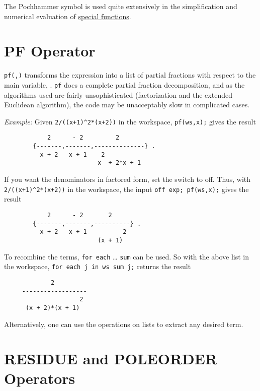 The Pochhammer symbol is used quite extensively in the simplification and
numerical evaluation of \hyperlink{SPECFNS}{special functions}.

\section{PF Operator}
\hypertarget{operator:PF}{}

\texttt{pf(,)} transforms the expression  into
a list of partial fractions with respect to the main variable, .
\texttt{pf}
does a complete partial fraction decomposition, and as the algorithms used
are fairly unsophisticated (factorization and the extended Euclidean
algorithm), the code may be unacceptably slow in complicated cases.

\textit{Example:}
Given \texttt{2/((x+1)\textasciicircum2*(x+2))} in the workspace,
\texttt{pf(ws,x);} gives the result
\begin{samepage}
\begin{verbatim}
            2      - 2         2
        {-------,-------,--------------} .
          x + 2   x + 1    2
                          x  + 2*x + 1
\end{verbatim}
\end{samepage}

If you want the denominators in factored form, set the switch  to off.
Thus, with \texttt{2/((x+1)\textasciicircum2*(x+2))} in the workspace,
the input \texttt{off exp; pf(ws,x);} gives the result
\begin{verbatim}
            2      - 2       2
        {-------,-------,----------} .
          x + 2   x + 1          2
                          (x + 1)
\end{verbatim}

To recombine the terms, \texttt{for each} \ldots{} \texttt{sum} can be used.
So with the above list in the workspace,
\texttt{for each j in ws sum j;} returns the result
\begin{verbatim}
             2
     ------------------
                     2
      (x + 2)*(x + 1)
\end{verbatim}

Alternatively, one can use the operations on lists to extract any desired
term.


\section{RESIDUE and POLEORDER Operators}
\hypertarget{operator:RESIDUE}{}
\hypertarget{operator:POLEORDER}{}

